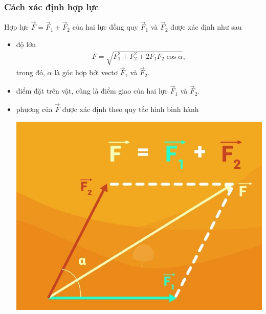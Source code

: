 \subsubsection{Cách xác định hợp lực}
Hợp lực $\vec{F}=\vec{F}_1+\vec{F}_2$ của hai lực đồng quy $\vec{F}_1$ và $\vec{F}_2$ được xác định như sau
	\begin{itemize}
		\item độ lớn 
			\begin{align*}
				F=\sqrt{F_1^2+F_2^2+2F_1F_2\cos \alpha},
			\end{align*}
			trong đó, $\alpha$ là góc hợp bởi vectơ $\vec{F}_1$ và $\vec{F}_2$.
		\item điểm đặt trên vật, cũng là điểm giao của hai lực $\vec{F}_1$ và $\vec{F}_2$.
		\item phương của $\vec{F}$ được xác định theo quy tắc hình bình hành
			\begin{center}
				\includegraphics[scale=0.35]{../figs/VN10-PH-11-L-008-2-V2-01.jpg}
			\end{center}
	\end{itemize}



